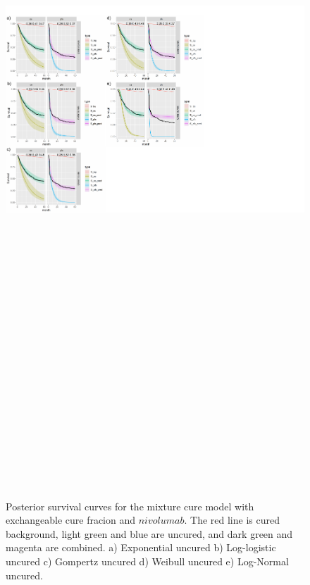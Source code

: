 \documentclass[
]{article}
\begin{document}
\begin{figure}

{\centering \includegraphics[width=25cm,height=40cm]{Check_mate_analysis_files/figure-latex/unnamed-chunk-8-1} 

}

\caption{\label{fig:NIVO}Posterior survival curves for the mixture cure model with exchangeable cure fracion and $nivolumab$. The red line is cured background, light green and blue are uncured, and dark green and magenta are combined. a) Exponential uncured b) Log-logistic uncured c) Gompertz uncured d) Weibull uncured e) Log-Normal uncured.}\label{fig:unnamed-chunk-8}
\end{figure}
\end{document}
